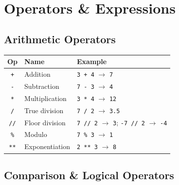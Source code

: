 \documentclass[oneside]{book}
\begin{document}
\section{Operators \& Expressions}

\subsection*{Arithmetic Operators}

\begin{center}
\begin{tabular}{cll}
\toprule
\textbf{Op} & \textbf{Name} & \textbf{Example} \\
\midrule
\texttt{+}  & Addition           & \texttt{3 + 4} $\to$ \texttt{7} \\
\texttt{-}  & Subtraction        & \texttt{7 - 3} $\to$ \texttt{4} \\
\texttt{*}  & Multiplication     & \texttt{3 * 4} $\to$ \texttt{12} \\
\texttt{/}  & True division      & \texttt{7 / 2} $\to$ \texttt{3.5} \\
\texttt{//} & Floor division     & \texttt{7 // 2} $\to$ \texttt{3}; \texttt{-7 // 2} $\to$ \texttt{-4} \\
\texttt{\%} & Modulo             & \texttt{7 \% 3} $\to$ \texttt{1} \\
\texttt{**} & Exponentiation     & \texttt{2 ** 3} $\to$ \texttt{8} \\
\bottomrule
\end{tabular}
\end{center}

\subsection*{Comparison \& Logical Operators}
\end{document}
